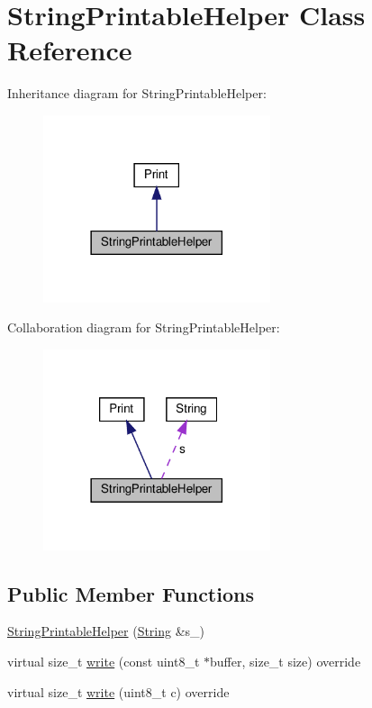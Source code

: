 \hypertarget{class_string_printable_helper}{}\section{String\+Printable\+Helper Class Reference}
\label{class_string_printable_helper}


Inheritance diagram for String\+Printable\+Helper\+:
\nopagebreak
\begin{figure}[H]
\begin{center}
\leavevmode
\includegraphics[width=189pt]{class_string_printable_helper__inherit__graph}
\end{center}
\end{figure}


Collaboration diagram for String\+Printable\+Helper\+:
\nopagebreak
\begin{figure}[H]
\begin{center}
\leavevmode
\includegraphics[width=189pt]{class_string_printable_helper__coll__graph}
\end{center}
\end{figure}
\subsection*{Public Member Functions}
\begin{DoxyCompactItemize}
\item 
\hyperlink{class_string_printable_helper_aee189f4d6b8a240ba9c0f69674e94fc7}{String\+Printable\+Helper} (\hyperlink{class_string}{String} \&s\+\_\+)
\item 
virtual size\+\_\+t \hyperlink{class_string_printable_helper_a8098bfb565b518cec0cf9e6fbc68eed8}{write} (const uint8\+\_\+t $\ast$buffer, size\+\_\+t size) override
\item 
virtual size\+\_\+t \hyperlink{class_string_printable_helper_adc5aab11289f917cefa1225b59afde2a}{write} (uint8\+\_\+t c) override
\end{DoxyCompactItemize}
